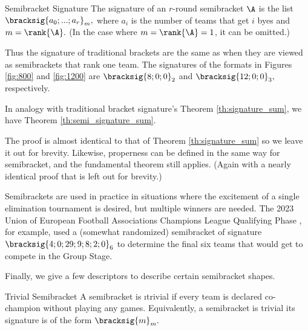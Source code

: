 {    \begin{definition}{Semibracket Signature}{}
        The \i{signature} of an $r$-round semibracket $\A$ is the list $\bracksig{a_0; ...; a_r}_m,$ where $a_i$ is the number of teams that get $i$ byes and $m = \rank{\A}.$ (In the case where $m = \rank{\A} = 1$, it can be omitted.)        
    \end{definition}

    Thus the signature of traditional brackets are the same as when they are viewed as semibrackets that rank one team. The signatures of the formats in Figures \ref{fig:800} and \ref{fig:1200} are $\bracksig{8;0;0}_2$ and $\bracksig{12;0;0}_3,$ respectively.

    In analogy with traditional bracket signature's Theorem \ref{th:signature_sum}, we have Theorem \ref{th:semi_signature_sum}.


    The proof is almost identical to that of Theorem \ref{th:signature_sum} so we leave it out for brevity. Likewise, properness can be defined in the same way for semibracket, and the fundamental theorem still applies. (Again with a nearly identical proof that is left out for brevity.)


    Semibrackets are used in practice in situations where the excitement of a single elimination tournament is desired, but multiple winners are needed. The 2023 Union of European Football Associations Champions League Qualifying Phase \cite{wiki_uefa}, for example, used a (somewhat randomized) semibracket of signature $\bracksig{4;0;29;9;8;2;0}_6$ to determine the final six teams that would get to compete in the Group Stage.


    Finally, we give a few descriptors to describe certain semibracket shapes.

    \begin{definition}{Trivial Semibracket}{}
        A semibracket is \i{trivial} if every team is declared co-champion without playing any games. Equivalently, a semibracket is trivial its signature is of the form $\bracksig{m}_m.$
    \end{definition}

}
